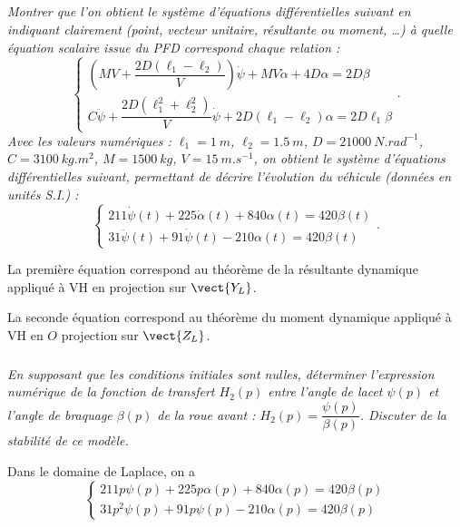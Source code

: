 \begin{multicols}{2}
\begin{corrige}
\end{corrige}
\else
\fi



\subparagraph{}\textit{Montrer que l’on obtient le système d’équations différentielles suivant
en indiquant clairement (point, vecteur unitaire, résultante ou moment, …) à
quelle équation scalaire issue du PFD correspond chaque relation :
$$ 
\left\{ 
\begin{array}{l}
\left(MV +\dfrac{2D\left( \ell_1 - \ell_2 \right)}{V}\right)\dot{\psi}+MV\dot{\alpha}+4D\alpha = 2D\beta \\
C\ddot{\psi}+\dfrac{2D\left(\ell_1^2+\ell_2^2\right)}{V}\dot{\psi}+2D\left(\ell_1-\ell_2\right)\alpha =2D\ell_1\beta
\end{array}
\right. 
.$$
Avec les valeurs numériques : $\ell_1=\SI{1}{m}$, $\ell_2=\SI{1,5}{m}$, $D=\SI{21000}{N.rad^{-1}}$, $C=\SI{3100}{kg.m ^2}$, $M=\SI{1500}{kg}$, $V=\SI{15}{m.s^{-1}}$, on obtient le système d'équations
différentielles suivant, permettant de décrire l'évolution du véhicule (données
en unités S.I.) :
$$
\left\{
\begin{array}{l}
211\dot{\psi}(t)+225\dot{\alpha}(t)+840\alpha(t)=420\beta(t) \\
31\ddot{\psi}(t)+91\dot{\psi}(t)-210\alpha(t)=420\beta(t) 
\end{array}
\right. .$$
}


\ifprof
\begin{corrige}
La première équation correspond au théorème de la résultante dynamique appliqué à VH en projection sur  $\vect{Y_L}$.

La seconde équation correspond au théorème du moment dynamique appliqué à VH en  $O$ projection sur  $\vect{Z_L}$.

\end{corrige}
\else
\fi
\subparagraph{}\textit{En supposant que les conditions initiales sont nulles, déterminer
l’expression numérique de la fonction de transfert $H_2(p)$ entre l’angle de lacet $\psi(p)$
et l’angle de braquage $\beta(p)$ de la roue avant : $H_2(p)=\dfrac{\psi(p)}{\beta(p)}$.
Discuter de la stabilité de ce modèle.}
\ifprof
\begin{corrige}
Dans le domaine de Laplace, on a 
$$
\left\{
\begin{array}{l}
211 p {\psi}(p)+225p{\alpha}(p)+840\alpha(p)=420\beta(p) \\
31p^2{\psi}(p)+91p{\psi}(p)-210\alpha(p)=420\beta(p) 
\end{array}
\right. $$


\end{corrige}
\end{multicols}
